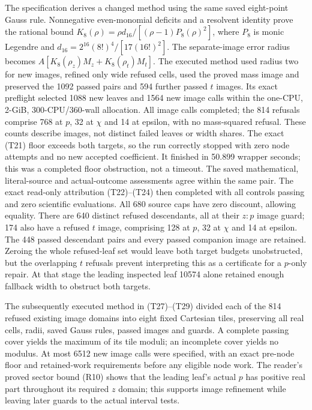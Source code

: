 \documentclass[10pt]{article}
\begin{document}
The specification derives a changed method using
the same saved eight-point Gauss rule. Nonnegative even-monomial
deficits and a resolvent identity prove the rational bound
$K_8(\rho)=\rho d_{16}/[(\rho-1)P_8(\rho)^2]$,
where $P_8$ is monic Legendre and
$d_{16}=2^{16}(8!)^4/[17(16!)^2]$.
The separate-image error radius becomes
$A[K_8(\rho_z)M_z+K_8(\rho_t)M_t]$.
The executed method used radius two for new images, refined only
wide refused cells, used the proved mass image and preserved
the 1092 passed pairs and 594 further passed $t$ images.
Its exact preflight selected 1088 new leaves and 1564 new image
calls within the one-CPU, 2-GiB, 300-CPU/360-wall allocation.
All image calls completed; the 814 refusals comprise 768 at
$p$, 32 at $\chi$ and 14 at epsilon, with no mass-squared
refusal. These counts describe images, not distinct failed
leaves or width shares. The exact (T21) floor exceeds both
targets, so the run correctly stopped with zero node attempts
and no new accepted coefficient. It finished in 50.899 wrapper
seconds; this was a completed floor obstruction, not a timeout.
The saved mathematical, literal-source and actual-outcome
assessments agree within the same pair.
The exact read-only attribution (T22)--(T24) then completed
with all controls passing and zero scientific evaluations.
All 680 source caps have zero discount, allowing equality.
There are 640 distinct refused descendants, all at their
$z:p$ image guard; 174 also have a refused $t$ image, comprising
128 at $p$, 32 at $\chi$ and 14 at epsilon. The 448 passed
descendant pairs and every passed companion image are retained.
Zeroing the whole refused-leaf set would leave both target
budgets unobstructed, but the overlapping $t$ refusals prevent
interpreting this as a certificate for a $p$-only repair.
At that stage the leading inspected leaf 10574 alone retained
enough fallback width to obstruct both targets.

The subsequently executed method in (T27)--(T29) divided each
of the 814 refused existing image domains into eight fixed
Cartesian tiles, preserving all real cells, radii, saved
Gauss rules, passed images and guards. A complete passing
cover yields the maximum of its tile moduli; an incomplete
cover yields no modulus. At most 6512 new image calls were
specified, with an exact pre-node floor and retained-work
requirements before any eligible node work. The reader's
proved sector bound (R10) shows that the leading leaf's actual
$p$ has positive real part throughout its required $z$ domain;
this supports image refinement while leaving later guards
to the actual interval tests.
\end{document}
